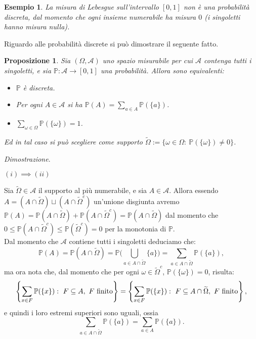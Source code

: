 \documentclass[11pt]{book}
\makeatletter
\theoremstyle{Definizione}
\theoremstyle{TeoremaProposizioneLemmaCorollario}
\newtheorem{mypropo}[myteo]{Proposizione}
\theoremstyle{OsservazioneNota}
\newtheorem{myes}{Esempio}[section]
\renewenvironment{proof}[1][\proofname]{\par
  \normalfont \topsep6\p@\@plus6\p@\relax
  \trivlist
  \item[\hskip\labelsep
        \itshape
    #1\@addpunct{.}]\ignorespaces
}{%
  \endtrivlist\@endpefalse
}
\renewcommand{\P}{\mathbb{P}}
\renewenvironment{proof}{\textsl{Dimostrazione}.}{}
\makeatother
\begin{document}
\begin{myes}
La misura di Lebesgue sull'intervallo $[0,1]$ non è una probabilità discreta, dal momento che ogni insieme numerabile ha misura $0$ (i singoletti hanno misura nulla).
\end{myes}
Riguardo alle probabilità discrete si può dimostrare il seguente fatto.
\begin{boxpro}
\begin{mypropo}
Sia $(\Omega,\mathcal{A})$ uno spazio misurabile per cui $\mathcal{A}$ contenga tutti i singoletti, e sia $\P:\mathcal{A}\longrightarrow [0,1]$ una probabilità. Allora sono equivalenti:
\begin{itemize}
\item[$(i)$] $\P$ è discreta.
\item[$(ii)$] Per ogni $A\in \mathcal{A}$ si ha $\P(A) = \sum_{a\in A} \P(\{a\})$.
\item[$(iii)$] $\sum_{\omega\in \Omega} \P(\{\omega\}) = 1$.
\end{itemize}
Ed in tal caso si può scegliere come supporto $\widetilde{\Omega} := \{\omega \in \Omega:\ \P(\{\omega\}) \neq 0\}$.
\end{mypropo}
\tcblower
\begin{proof}
\hfill
\begin{flushleft}
$(i) \implies (ii)$
\end{flushleft}
Sia $\widetilde{\Omega}\in \mathcal{A}$ il supporto al più numerabile, e sia $A\in \mathcal{A}$. Allora essendo $A = (A \cap \widetilde{\Omega}) \sqcup (A \cap \widetilde{\Omega}^c)$ un'unione disgiunta avremo $\P(A) = \P(A\cap \widetilde{\Omega}) + \P(A\cap \widetilde{\Omega}^c) = \P(A\cap \widetilde{\Omega})$ dal momento che $0\leq \P(A\cap \widetilde{\Omega}^c) \leq \P(\widetilde{\Omega}^c) = 0$ per la monotonia di $\P$.\\
Dal momento che $\mathcal{A}$ contiene tutti i singoletti deduciamo che:
$$
\P(A) = \P(A\cap \widetilde{\Omega}) = \P\Bigg(\bigcup_{a\in A\cap \widetilde{\Omega}} \{a\}\Bigg) = \sum_{a\in A\cap \widetilde{\Omega}} \P(\{a\}),
$$
ma ora nota che, dal momento che per ogni $\omega\in \widetilde{\Omega}^c$, $\P(\{\omega\}) = 0$, risulta:
$$
\left\{\sum_{x\in F} \P(\{x\}):\ F\subseteq A,\ F\textup{ finito}\right\} = \left\{\sum_{x\in F} \P(\{x\}):\ F\subseteq A \cap \widetilde{\Omega},\  F \textup{ finito}\right\},
$$
e quindi i loro  estremi superiori sono uguali, ossia
$$
\sum_{a\in A\cap \widetilde{\Omega}} \P(\{a\}) = \sum_{a\in A} \P(\{a\}).
$$
\begin{flushleft}

\end{flushleft}
\end{proof}
\end{boxpro}
\end{document}
